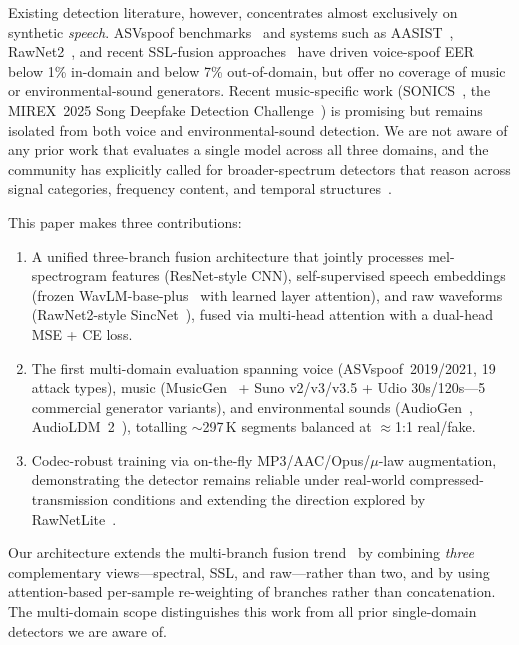 \documentclass[10pt,twocolumn,a4paper]{article}
\begin{document}
Existing detection literature, however, concentrates almost exclusively on synthetic \textit{speech}. ASVspoof benchmarks~\cite{asvspoof2019,asvspoof2021,asvspoof5} and systems such as AASIST~\cite{aasist}, RawNet2~\cite{rawnet2}, and recent SSL-fusion approaches~\cite{amff_nexttdnn_2025,wavlm_mfac_2023,combei2024_wavlm_ensemble,ssl_layer_fusion_2025} have driven voice-spoof EER below 1\% in-domain and below 7\% out-of-domain, but offer no coverage of music or environmental-sound generators. Recent music-specific work (SONICS~\cite{sonics_2024}, the MIREX~2025 Song Deepfake Detection Challenge~\cite{mirex2025_song_deepfake}) is promising but remains isolated from both voice and environmental-sound detection. We are not aware of any prior work that evaluates a single model across all three domains, and the community has explicitly called for broader-spectrum detectors that reason across signal categories, frequency content, and temporal structures~\cite{frontiers_aiaudio_2025}.

This paper makes three contributions:
\begin{enumerate}
    \item A unified three-branch fusion architecture that jointly processes mel-spectrogram features (ResNet-style CNN), self-supervised speech embeddings (frozen WavLM-base-plus~\cite{wavlm} with learned layer attention), and raw waveforms (RawNet2-style SincNet~\cite{sincnet,rawnet2}), fused via multi-head attention with a dual-head MSE + CE loss.
    \item The first multi-domain evaluation spanning voice (ASVspoof~2019/2021, 19 attack types), music (MusicGen~\cite{musicgen_2023} + Suno v2/v3/v3.5 + Udio 30s/120s---5 commercial generator variants), and environmental sounds (AudioGen~\cite{audiogen_2023}, AudioLDM~2~\cite{audioldm2_2024}), totalling $\sim$297\,K segments balanced at $\approx$1:1 real/fake.
    \item Codec-robust training via on-the-fly MP3/AAC/Opus/$\mu$-law augmentation, demonstrating the detector remains reliable under real-world compressed-transmission conditions and extending the direction explored by RawNetLite~\cite{rawnetlite_2025}.
\end{enumerate}

Our architecture extends the multi-branch fusion trend~\cite{amff_nexttdnn_2025,hurawnet2_2023,resnext_spectral_2025,raptor_2026} by combining \textit{three} complementary views---spectral, SSL, and raw---rather than two, and by using attention-based per-sample re-weighting of branches rather than concatenation. The multi-domain scope distinguishes this work from all prior single-domain detectors we are aware of.
\end{document}
